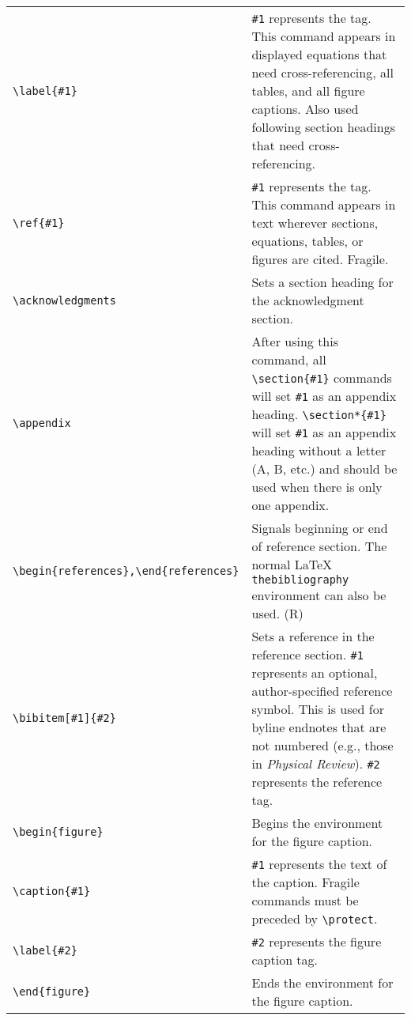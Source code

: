 \begin{quasitable}
\begin{tabular}{lp{4.5in}}
\verb+\label{#1}+  &
     \verb+#1+ represents the tag. This command appears in
               displayed equations that need cross-referencing, all
               tables, and all figure captions. Also used following
               section headings that need cross-referencing.
                 \\[4pt]

\verb+\ref{#1}+  &
                \verb+#1+ represents the tag. This command appears in text
                        wherever sections, equations, tables, or figures are
                        cited. Fragile.
                          \\[4pt]

\verb+\acknowledgments+  &
        Sets a section heading for the acknowledgment section.
                          \\[4pt]

\verb+\appendix+  &
               After using this command, all \verb+\section{#1}+ commands
      will set \verb+#1+ as an appendix heading.  \verb+\section*{#1}+ will
      set \verb+#1+ as an appendix heading without a letter
      (A, B, etc.) and should be used when there is only one
      appendix.
        \\[4pt]

\verb+\begin{references},\end{references}+
        & Signals beginning or end of reference section. The
         normal \LaTeX{} \verb+thebibliography+ environment can also
                        be used. (R)
                          \\[4pt]

\verb+\bibitem[#1]{#2}+  &
        Sets a reference in the reference section.  \verb+#1+
                        represents an optional, author-specified reference
                        symbol. This is used for byline endnotes that are
                        not numbered (e.g., those in {\em Physical Review\/}).
                        \verb+#2+ represents the reference tag.  \\[4pt]

\verb+\begin{figure}+  &
          Begins the environment for the figure caption.\\[4pt]
\verb+\caption{#1}+    &
        \verb+#1+ represents the text of the caption.
      Fragile commands must be preceded by \verb+\protect+.
        \\[4pt]
\verb+\label{#2}+      &
        \verb+#2+ represents the figure caption tag.\\[4pt]
\verb+\end{figure}+    &
        Ends the environment for the figure caption.
                          \\[4pt]


\end{tabular}
\end{quasitable}
